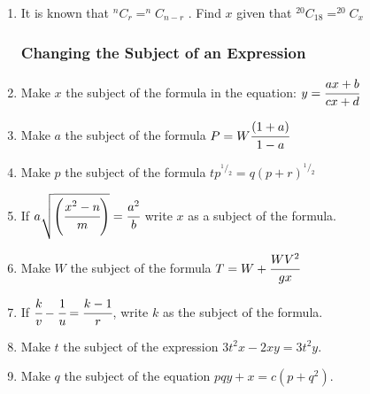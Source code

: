 \begin{enumerate}
	\item It is known that $^nC_r = ^nC_{n - r}$
. Find $x$ given that $^{20}C_{18} = ^{20}C_x$

		
		\subsubsection{Changing the Subject of an Expression}	
		
	\item Make $x$ the subject of the formula in the equation: $y = \cfrac{ax + b}{cx + d}$
	
	\item Make $a$ the subject of the formula $P = W\cfrac{(1 + a)}{1 - a}$
	
	\item Make $p$ the subject of the formula $tp^{^1/_2} = q(p + r)^{^1/_2}$
	
	\item If $a\sqrt{\left(\cfrac{x^2 - n}{m}\right)} = \cfrac{a^2}{b}$ write $x$ as a subject of the formula.
	
	\item Make $W$ the subject of the formula $T = W + \cfrac{WV^2}{gx}$
	
	\item If $\cfrac{k}{v} - \cfrac{1}{u} = \cfrac{k - 1}{r}$, write $k$ as the subject of the formula.
	
	\item Make $t$ the subject of the expression $3t^2x - 2xy = 3t^2y$.
	
	\item Make $q$ the subject of the equation $pqy + x = c(p + q^2)$.
		
		
\end{enumerate}				
		
	
